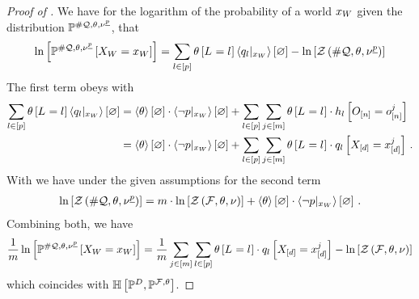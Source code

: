 \begin{proof}[Proof of ]
    We have for the logarithm of the probability of a world $x_{W}$ given the distribution $\mathbb{P}^{\#\mathcal{Q},\theta,\nu^{\underline{p}}}$, that
    \begin{align*}
        \ln \left[ \mathbb{P}^{\#\mathcal{Q},\theta,\nu^{\underline{p}}}\left[X_{W}=x_{W}\right] \right]
        =  \sum_{l\in[p]} \theta\left[L_{}=l_{}\right] \left\langle {q_{l}}|_{x_{W}}\right\rangle \left[ \varnothing \right] - \ln \left[ \mathcal{Z}\left(\#\mathcal{Q},\theta,\nu^{\underline{p}}\right) \right]
    \end{align*}
    The first term obeys with 
    \begin{align*}
        \sum_{l\in[p]} \theta\left[L_{}=l_{}\right] \left\langle {q_{l}}|_{x_{W}}\right\rangle \left[ \varnothing \right]
        &=  \left\langle \theta\right\rangle \left[ \varnothing \right] \cdot \left\langle {\lnot p}|_{x_{W}}\right\rangle \left[ \varnothing \right]
        + \sum_{l\in[p]}\sum_{j\in[m]} \theta\left[L_{}=l_{}\right] \cdot h_{l}\left[O_{[n]}=o_{[n]}^{j}\right] \\
        &= \left\langle \theta\right\rangle \left[ \varnothing \right] \cdot \left\langle {\lnot p}|_{x_{W}}\right\rangle \left[ \varnothing \right]
        + \sum_{l\in[p]}\sum_{j\in[m]} \theta\left[L_{}=l_{}\right] \cdot q_{l}\left[X_{[d]}=x_{[d]}^{j}\right] \, .
    \end{align*}
    With  we have under the given assumptions for the second term
    \begin{align*}
        \ln \left[ \mathcal{Z}\left(\#\mathcal{Q},\theta,\nu^{\underline{p}}\right) \right] = m \cdot \ln \left[ \mathcal{Z}\left(\mathcal{F},\theta,\nu\right) \right]  + \left\langle \theta\right\rangle \left[ \varnothing \right] \cdot \left\langle {\lnot p}|_{x_{W}}\right\rangle \left[ \varnothing \right] \, .
    \end{align*}
    Combining both, we have
    \begin{align*}
        \frac{1}{m} \ln \left[ \mathbb{P}^{\#\mathcal{Q},\theta,\nu^{\underline{p}}}\left[X_{W}=x_{W}\right] \right]
        =  \frac{1}{m}\sum_{j\in[m]}\sum_{l\in[p]} \theta\left[L_{}=l_{}\right] \cdot q_{l}\left[X_{[d]}=x_{[d]}^{j}\right]  - \ln \left[ \mathcal{Z}\left(\mathcal{F},\theta,\nu\right) \right]
    \end{align*}
    which coincides with $\mathbb{H}\left[\mathbb{P}^{D},\mathbb{P}^{\mathcal{F},\theta}\right]$.
\end{proof}


